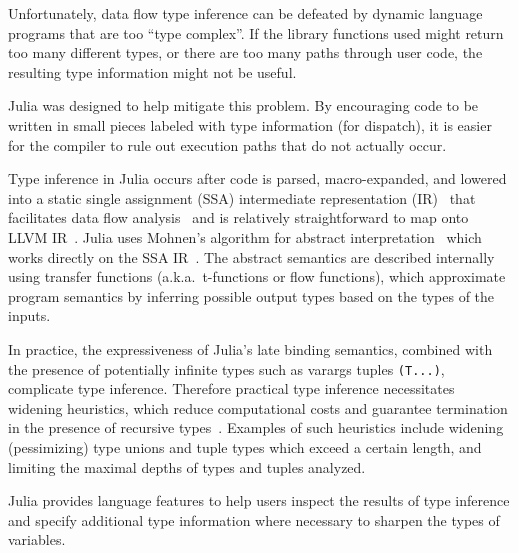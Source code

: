 \documentclass[10pt, preprint]{sigplanconf}
\begin{document}
Unfortunately, data flow type inference can be defeated
by dynamic language programs that are too ``type complex''. If the library
functions used might return too many different types, or there are too
many paths through user code, the resulting type information might not
be useful.

Julia was designed to help mitigate this problem. By encouraging
code to be written in small pieces labeled with type information (for
dispatch), it is easier for the compiler to rule out execution paths
that do not actually occur.

Type inference in Julia occurs after code is parsed, macro-expanded, and
lowered into a static single assignment (SSA) intermediate representation
(IR)~\cite{Alpern1988,Rosen1988} that facilitates data flow
analysis~\cite{Cousot1977,Cousot2000,Nielson2005} and is relatively
straightforward to map onto LLVM IR~\cite{Lattner2004}. Julia uses Mohnen's algorithm
for abstract interpretation~\cite{Cousot1992} which works directly on the SSA
IR~\cite{Mohnen2002}. The abstract semantics are described internally using
transfer functions (a.k.a.\ t-functions or flow functions), which approximate
program semantics by inferring possible output types based on the types of
the inputs.

In practice, the expressiveness of Julia's late binding semantics, combined
with the presence of potentially infinite types such as varargs tuples
\verb|(T...)|, complicate type inference.
Therefore practical type inference necessitates
widening heuristics, which reduce computational costs and guarantee termination
in the presence of recursive types~\cite{Cousot1992a}. Examples of such
heuristics include widening (pessimizing) type unions and tuple types which
exceed a certain length, and limiting the maximal depths of types
and tuples analyzed.

Julia provides language features to help users inspect the results of type
inference and specify additional type information where necessary to sharpen
the types of variables.
\end{document}
